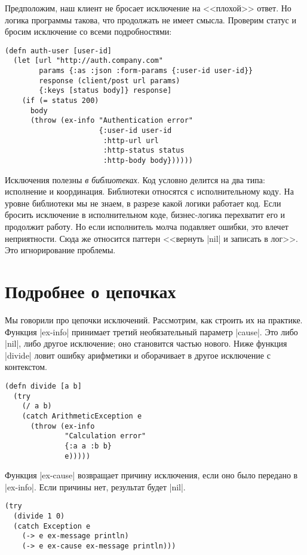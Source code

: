 Предположим, наш клиент не бросает исключение на <<плохой>> ответ. Но логика
программы такова, что продолжать не имеет смысла. Проверим статус и бросим
исключение со всеми подробностями:

\begin{verbatim}
(defn auth-user [user-id]
  (let [url "http://auth.company.com"
        params {:as :json :form-params {:user-id user-id}}
        response (client/post url params)
        {:keys [status body]} response]
    (if (= status 200)
      body
      (throw (ex-info "Authentication error"
                      {:user-id user-id
                       :http-url url
                       :http-status status
                       :http-body body})))))
\end{verbatim}

Исключения полезны \emph{в библиотеках}. Код условно делится на два типа:
исполнение и координация. Библиотеки относятся с исполнительному коду. На уровне
библиотеки мы не знаем, в разрезе какой логики работает код. Если бросить
исключение в исполнительном коде, бизнес-логика перехватит его и продолжит
работу. Но если исполнитель молча подавляет ошибки, это влечет
неприятности. Сюда же относится паттерн <<вернуть \spverb|nil| и записать в
лог>>. Это игнорирование проблемы.

\section{Подробнее о цепочках}

Мы говорили про цепочки исключений. Рассмотрим, как строить их на
практике. Функция \spverb|ex-info| принимает третий необязательный параметр
\spverb|cause|. Это либо \spverb|nil|, либо другое исключение; оно становится
частью нового. Ниже функция \spverb|divide| ловит ошибку арифметики и
оборачивает в другое исключение с контекстом.

\begin{verbatim}
(defn divide [a b]
  (try
    (/ a b)
    (catch ArithmeticException e
      (throw (ex-info
              "Calculation error"
              {:a a :b b}
              e)))))
\end{verbatim}

Функция \spverb|ex-cause| возвращает причину исключения, если оно было передано
в \spverb|ex-info|. Если причины нет, результат будет \spverb|nil|.

\begin{verbatim}
(try
  (divide 1 0)
  (catch Exception e
    (-> e ex-message println)
    (-> e ex-cause ex-message println)))
\end{verbatim}

